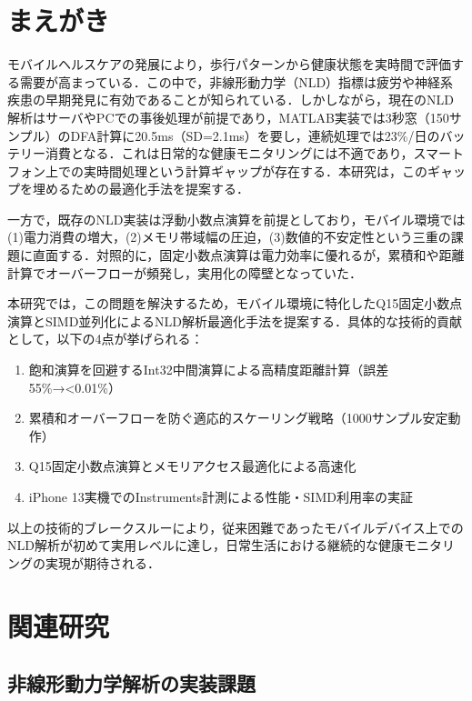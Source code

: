 \documentclass[paper]{ieice}
\begin{document}
\section{まえがき}

モバイルヘルスケアの発展により，歩行パターンから健康状態を実時間で評価する需要が高まっている．この中で，非線形動力学（NLD）指標は疲労や神経系疾患の早期発見に有効であることが知られている\cite{hausdorff2009}\cite{peng1995}．しかしながら，現在のNLD解析はサーバやPCでの事後処理が前提であり，MATLAB実装では3秒窓（150サンプル）のDFA計算に20.5ms（SD=2.1ms）を要し，連続処理では23\%/日のバッテリー消費となる．これは日常的な健康モニタリングには不適であり，スマートフォン上での実時間処理という計算ギャップが存在する．本研究は，このギャップを埋めるための最適化手法を提案する．

一方で，既存のNLD実装は浮動小数点演算を前提としており，モバイル環境では(1)電力消費の増大，(2)メモリ帯域幅の圧迫，(3)数値的不安定性という三重の課題に直面する．対照的に，固定小数点演算は電力効率に優れるが，累積和や距離計算でオーバーフローが頻発し，実用化の障壁となっていた．

本研究では，この問題を解決するため，モバイル環境に特化したQ15固定小数点演算とSIMD並列化によるNLD解析最適化手法を提案する．具体的な技術的貢献として，以下の4点が挙げられる：

\begin{enumerate}
\item 飽和演算を回避するInt32中間演算による高精度距離計算（誤差55\%→<0.01\%）
\item 累積和オーバーフローを防ぐ適応的スケーリング戦略（1000サンプル安定動作）
\item Q15固定小数点演算とメモリアクセス最適化による高速化
\item iPhone 13実機でのInstruments計測による性能・SIMD利用率の実証
\end{enumerate}

以上の技術的ブレークスルーにより，従来困難であったモバイルデバイス上でのNLD解析が初めて実用レベルに達し，日常生活における継続的な健康モニタリングの実現が期待される．

\section{関連研究}

\subsection{非線形動力学解析の実装課題}
\end{document}
